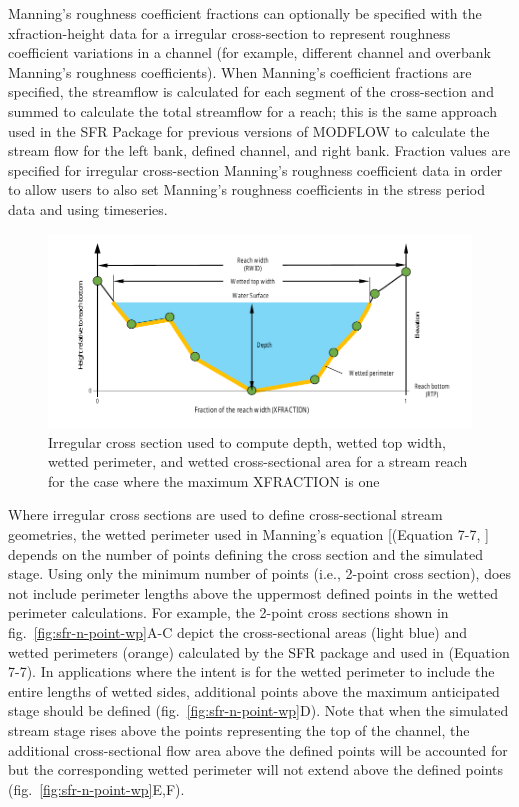 Manning's roughness coefficient fractions can optionally be specified with the xfraction-height data for a irregular cross-section to represent roughness coefficient variations in a channel (for example, different channel and overbank Manning's roughness coefficients). When Manning's coefficient fractions are specified, the streamflow is calculated for each segment of the cross-section and summed to calculate the total streamflow for a reach; this is the same approach used in the SFR Package for previous versions of MODFLOW \citep{modflowsfr1pack} to calculate the stream flow for the left bank, defined channel, and right bank. Fraction values are specified for irregular cross-section Manning's roughness coefficient data in order to allow users to also set Manning's roughness coefficients in the stress period data and using timeseries.


\begin{figure}[ht]
	\centering
	\includegraphics[scale=1.0]{../Figures/n-point-cross-section}
	\caption[Illustration of a irregular cross section used to compute depth, wetted top width, wetted perimeter, and wetted cross-sectional area for a stream reach]{Irregular cross section used to compute depth, wetted top width, wetted perimeter, and wetted cross-sectional area for a stream reach for the case where the maximum XFRACTION is one}
	\label{fig:sfr-n-point}
\end{figure}

Where irregular cross sections are used to define cross-sectional stream geometries, the wetted perimeter used in Manning’s equation [(Equation 7-7, \cite{modflow6gwf}] depends on the number of points defining the cross section and the simulated stage.  Using only the minimum number of points (i.e., 2-point cross section), \mf does not include perimeter lengths above the uppermost defined points in the wetted perimeter calculations. For example, the 2-point cross sections shown in fig.~\ref{fig:sfr-n-point-wp}A-C depict the cross-sectional areas (light blue) and wetted perimeters (orange) calculated by the SFR package and used in \cite{modflow6gwf} (Equation 7-7).  In applications where the intent is for the wetted perimeter to include the entire lengths of wetted sides, additional points above the maximum anticipated stage should be defined (fig.~\ref{fig:sfr-n-point-wp}D).  Note that when the simulated stream stage rises above the points representing the top of the channel, the additional cross-sectional flow area above the defined points will be accounted for but the corresponding wetted perimeter will not extend above the defined points (fig.~\ref{fig:sfr-n-point-wp}E,F).


